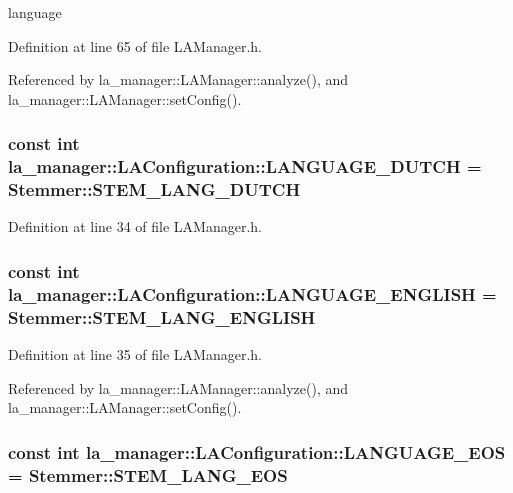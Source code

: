 language 



Definition at line 65 of file LAManager.h.

Referenced by la\_\-manager::LAManager::analyze(), and la\_\-manager::LAManager::setConfig().\hypertarget{classla__manager_1_1LAConfiguration_6e4734d71a49f6a79190dd9bcaa482fc}{
\subsubsection[{LANGUAGE\_\-DUTCH}]{\setlength{\rightskip}{0pt plus 5cm}const int {\bf la\_\-manager::LAConfiguration::LANGUAGE\_\-DUTCH} = Stemmer::STEM\_\-LANG\_\-DUTCH}}
\label{classla__manager_1_1LAConfiguration_6e4734d71a49f6a79190dd9bcaa482fc}




Definition at line 34 of file LAManager.h.\hypertarget{classla__manager_1_1LAConfiguration_6da3eb83fc013880eecb635178f0631a}{
\subsubsection[{LANGUAGE\_\-ENGLISH}]{\setlength{\rightskip}{0pt plus 5cm}const int {\bf la\_\-manager::LAConfiguration::LANGUAGE\_\-ENGLISH} = Stemmer::STEM\_\-LANG\_\-ENGLISH}}
\label{classla__manager_1_1LAConfiguration_6da3eb83fc013880eecb635178f0631a}




Definition at line 35 of file LAManager.h.

Referenced by la\_\-manager::LAManager::analyze(), and la\_\-manager::LAManager::setConfig().\hypertarget{classla__manager_1_1LAConfiguration_139bdfd5b3dac7170cbc9c5df132c6dc}{
\subsubsection[{LANGUAGE\_\-EOS}]{\setlength{\rightskip}{0pt plus 5cm}const int {\bf la\_\-manager::LAConfiguration::LANGUAGE\_\-EOS} = Stemmer::STEM\_\-LANG\_\-EOS}}
\label{classla__manager_1_1LAConfiguration_139bdfd5b3dac7170cbc9c5df132c6dc}




